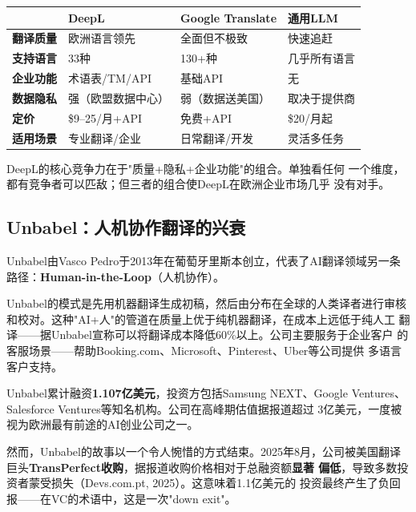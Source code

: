 \begin{keybox}[AI翻译市场竞争格局]
\small
\begin{tabularx}{\textwidth}{l X X X}
\toprule
\rowcolor{figLightGray}
& \textbf{DeepL} & \textbf{Google Translate} & \textbf{通用LLM} \\
\midrule
\textbf{翻译质量} & 欧洲语言领先 & 全面但不极致 & 快速追赶 \\
\textbf{支持语言} & 33种 & 130+种 & 几乎所有语言 \\
\textbf{企业功能} & 术语表/TM/API & 基础API & 无 \\
\textbf{数据隐私} & 强（欧盟数据中心） & 弱（数据送美国） & 取决于提供商 \\
\textbf{定价} & \$9--25/月+API & 免费+API & \$20/月起 \\
\textbf{适用场景} & 专业翻译/企业 & 日常翻译/开发 & 灵活多任务 \\
\bottomrule
\end{tabularx}

\medskip
\noindent DeepL的核心竞争力在于"质量+隐私+企业功能"的组合。单独看任何
一个维度，都有竞争者可以匹敌；但三者的组合使DeepL在欧洲企业市场几乎
没有对手。
\end{keybox}

\subsection{Unbabel：人机协作翻译的兴衰}
\label{subsec:unbabel}

Unbabel由Vasco Pedro于2013年在葡萄牙里斯本创立，代表了AI翻译领域另一条
路径：\textbf{Human-in-the-Loop}（人机协作）。

Unbabel的模式是先用机器翻译生成初稿，然后由分布在全球的人类译者进行审核
和校对。这种"AI+人"的管道在质量上优于纯机器翻译，在成本上远低于纯人工
翻译——据Unbabel宣称可以将翻译成本降低60\%以上。公司主要服务于企业客户
的客服场景——帮助Booking.com、Microsoft、Pinterest、Uber等公司提供
多语言客户支持。

Unbabel累计融资\textbf{1.107亿美元}，投资方包括Samsung NEXT、Google
Ventures、Salesforce Ventures等知名机构。公司在高峰期估值据报道超过
3亿美元，一度被视为欧洲最有前途的AI创业公司之一。

然而，Unbabel的故事以一个令人惋惜的方式结束。2025年8月，公司被美国翻译
巨头\textbf{TransPerfect收购}，据报道收购价格相对于总融资额\textbf{显著
偏低}，导致多数投资者蒙受损失（Devs.com.pt, 2025）。这意味着1.1亿美元的
投资最终产生了负回报——在VC的术语中，这是一次"down exit"。

